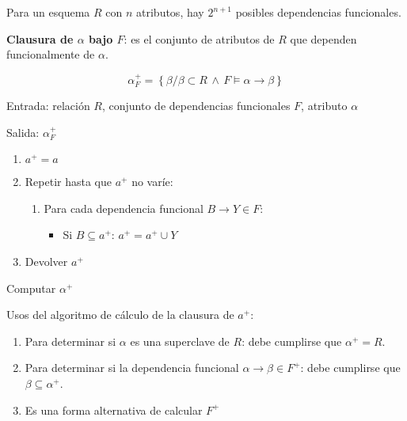 \documentclass[a4paper, twoside]{article}
\begin{document}
Para un esquema $R$ con $n$ atributos, hay $2^{n+1}$ posibles dependencias funcionales.

\textbf{Clausura de $\alpha$ bajo $F$}: es el conjunto de atributos de $R$ que dependen funcionalmente de $\alpha$.

\[
	\alpha_{F}^{+}=\left\{ \beta/\beta\subset R\,\wedge\, F\vDash\alpha\to\beta\right\} 
\]

\begin{algorithm}[H]
	Entrada: relación $R$, conjunto de dependencias funcionales $F$, atributo $\alpha$

	Salida: $\alpha_{F}^{+}$
	\begin{enumerate}
		\item $a^{+} = a$

		\item Repetir hasta que $a^{+}$ no varíe:
		\begin{enumerate}
			\item Para cada dependencia funcional $B\to Y\in F$:
			\begin{itemize}
				\item Si $B \subseteq a^{+}$: $a^{+} = a^{+}\cup Y$
			\end{itemize}
		\end{enumerate}
		
		\item Devolver $a^{+}$
	\end{enumerate}
	\caption{Computar $\alpha^{+}$}
\end{algorithm}

Usos del algoritmo de cálculo de la clausura de $a^{+}$:
\begin{enumerate}
	\item Para determinar si $\alpha$ es una superclave de $R$: debe cumplirse que $\alpha^{+}=R$.
	\item Para determinar si la dependencia funcional $\alpha\to\beta\in F^{+}$: debe cumplirse que $\beta\subseteq\alpha^{+}$.
	\item Es una forma alternativa de calcular $F^{+}$
\end{enumerate}
\end{document}
